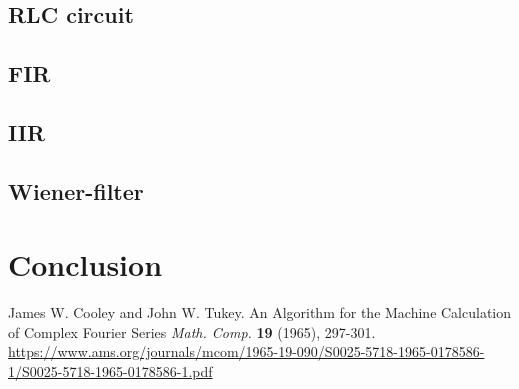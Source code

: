 \documentclass[12pt]{article}
\theoremstyle{plain}
\begin{document}
\subsection{RLC circuit}


\subsection{FIR}


\subsection{IIR}


\subsection{Wiener-filter}



\section{Conclusion}

\newpage
\begin{thebibliography}{Nature}
%

\hypertarget{James W. Cooley and John W. Tukey (1965)}{}
James W. Cooley and John W. Tukey. An Algorithm for the Machine Calculation of Complex Fourier Series \textit{Math. Comp.} \textbf{19} (1965), 297-301. \url{https://www.ams.org/journals/mcom/1965-19-090/S0025-5718-1965-0178586-1/S0025-5718-1965-0178586-1.pdf}

\end{thebibliography}
\end{document}
